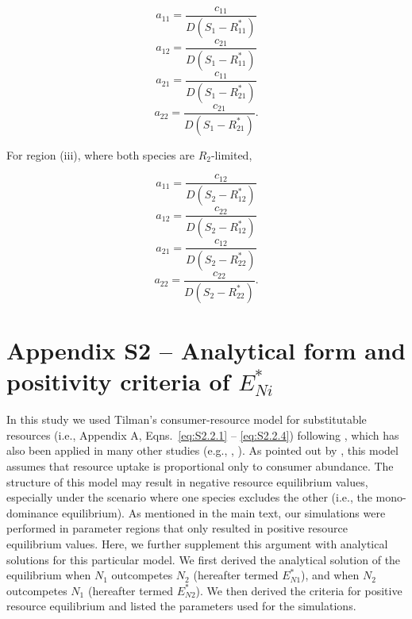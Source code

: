 \begin{equation}
a_{11}=\frac{c_{11}}{D\left ( S_{1}-R_{11}^{*} \right )}
\tag{S2.17.1}\label{eq:S2.17.1}
\end{equation} 
\begin{equation}
a_{12}=\frac{c_{21}}{D\left ( S_{1}-R_{11}^{*} \right )}
\tag{S2.17.2}\label{eq:S2.17.2} 
\end{equation}
\begin{equation}
a_{21}=\frac{c_{11}}{D\left ( S_{1}-R_{21}^{*} \right )}
\tag{S2.17.3}\label{eq:S2.17.3}
\end{equation}
\begin{equation}
a_{22}=\frac{c_{21}}{D\left ( S_{1}-R_{21}^{*} \right )}.
\tag{S2.17.4}\label{eq:S2.17.4}
\end{equation}

\noindent For region (iii), where both species are $R_{2}$-limited, 

\begin{equation}
a_{11}=\frac{c_{12}}{D\left ( S_{2}-R_{12}^{*} \right )}
\tag{S2.18.1}\label{eq:S2.18.1}
\end{equation}
\begin{equation}
a_{12}=\frac{c_{22}}{D\left ( S_{2}-R_{12}^{*} \right )}
\tag{S2.18.2}\label{eq:S2.18.2}
\end{equation}
\begin{equation}
a_{21}=\frac{c_{12}}{D\left ( S_{2}-R_{22}^{*} \right )}
\tag{S2.18.3}\label{eq:S2.18.3}
\end{equation}
\begin{equation}
a_{22}=\frac{c_{22}}{D\left ( S_{2}-R_{22}^{*} \right )}.
\tag{S2.18.4}\label{eq:S2.18.4}
\end{equation}



\section{Appendix S2 -- Analytical form and positivity criteria of $E_{Ni}^{*}$}
In this study we used Tilman's consumer-resource model for substitutable resources (i.e., Appendix A, Eqns.~\ref{eq:S2.2.1} -- \ref{eq:S2.2.4}) following \cite[p.~270]{tilman1982}, which has also been applied in many other studies (e.g., \cite{Meszenaz2006}, \cite{Barabas2014}). As pointed out by \cite{Kleinhesselink2015}, this model assumes that resource uptake is proportional only to consumer abundance. The structure of this model may result in negative resource equilibrium values, especially under the scenario where one species excludes the other (i.e., the mono-dominance equilibrium). As mentioned in the main text, our simulations were performed in parameter regions that only resulted in positive resource equilibrium values. Here, we further supplement this argument with analytical solutions for this particular model. We first derived the analytical solution of the equilibrium when $N_1$ outcompetes $N_2$ (hereafter termed \textbf{$E_{N1}^{*}$}), and when $N_2$ outcompetes $N_1$ (hereafter termed \textbf{$E_{N2}^{*}$}). We then derived the criteria for positive resource equilibrium and listed the parameters used for the simulations. 
\par


